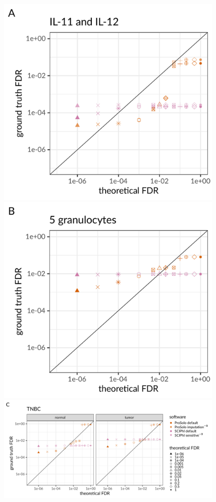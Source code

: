 \documentclass[authoryear,preprint,11pt]{scrartcl}
\begin{document}
\begin{figure}[!tpb]
 \begin{minipage}[t]{.49\linewidth}
 \vspace{0pt}
  \includegraphics[height=40ex]{figs/Dong2017/Dong2017_prosolo-sciphi_FDR_ground_truth_vs_theoretical.pdf} \newline
 \end{minipage}
 \begin{minipage}[t]{.49\linewidth}
 \vspace{0pt}
  \includegraphics[height=40ex]{figs/Laehnemann2017/Laehnemann2017_prosolo-sciphi_FDR_ground_truth_vs_theoretical.pdf} \newline
 \end{minipage}
 \begin{minipage}[t]{.99\linewidth}
 \vspace{0pt}
  \includegraphics[height=40ex]{figs/Wang2014/Wang2014_prosolo-sciphi_FDR_ground_truth_vs_theoretical.pdf} \newline

\end{minipage}
\end{figure}
\end{document}
